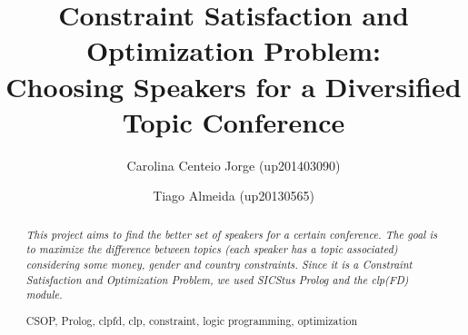 \documentclass[runningheads,a4paper]{llncs}
\newcommand{\keywords}[1]{\par\addvspace\baselineskip
\noindent\keywordname\enspace\ignorespaces#1}
\begin{document}
\mainmatter  %

\title{Constraint Satisfaction and Optimization Problem:\\Choosing Speakers for a Diversified Topic Conference}


%
%
\author{Carolina Centeio Jorge (up201403090)
\and Tiago Almeida (up20130565)}
%


%
%

\maketitle


\begin{abstract}
\emph{This project aims to find the better set of speakers for a certain conference. The goal is to maximize the difference between topics (each speaker has a topic associated) considering some money, gender and country constraints. Since it is a Constraint Satisfaction and Optimization Problem, we used SICStus Prolog and the clp(FD) module.}
\keywords{CSOP, Prolog, clpfd, clp, constraint, logic programming, optimization}
\end{abstract}
\end{document}
